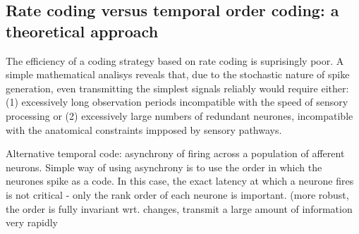 \documentclass[12pt]{article}
\begin{document}
\subsection{Rate coding versus temporal order coding: a theoretical approach \cite{gautrais1998rate}}

The efficiency of a coding strategy based on rate coding is suprisingly poor.
A simple mathematical analisys reveals that, due to the stochastic nature of spike generation, even transmitting the simplest signals reliably would require either: (1) excessively long observation periods incompatible with the speed of sensory processing or (2) excessively large numbers of redundant neurones, incompatible with the anatomical constraints impposed by sensory pathways.

Alternative temporal code: asynchrony of firing across a population of afferent neurons. Simple way of using asynchrony is to use the order in which the neurones spike as a code. In this case, the exact latency at which a neurone fires is not critical - only the rank order of each neurone is important. (more robust, the order is fully invariant wrt. changes, transmit a large amount of information very rapidly 




\end{document}
